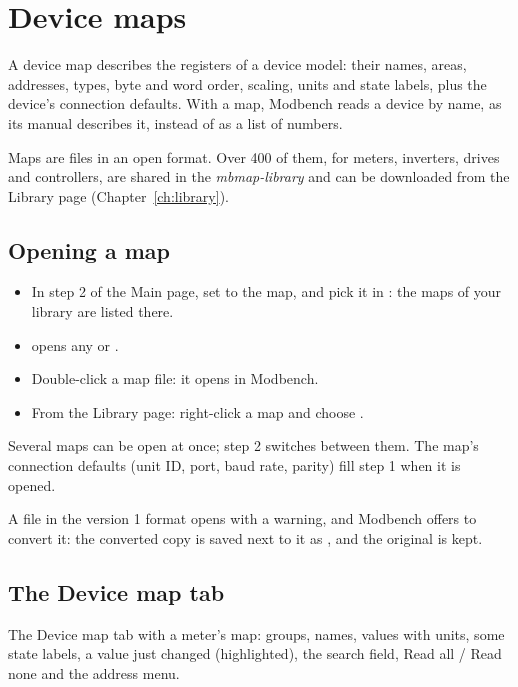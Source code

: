 \chapter{Device maps}
\label{ch:maps}

A device map describes the registers of a device model: their names, areas,
addresses, types, byte and word order, scaling, units and state labels, plus
the device's connection defaults. With a map, Modbench reads a device by
name, as its manual describes it, instead of as a list of numbers.

Maps are  files in an open format. Over 400 of them, for
meters, inverters, drives and controllers, are shared in the
\emph{mbmap-library} and can be downloaded from the Library page
(Chapter~\ref{ch:library}).

\section{Opening a map}

\begin{itemize}
  \item In step 2 of the Main page, set  to the map, and pick it
        in : the maps of your library are listed there.
  \item {} opens any  or .
  \item Double-click a map file: it opens in Modbench.
  \item From the Library page: right-click a map and choose .
\end{itemize}

Several maps can be open at once; step 2 switches between them.
The map's connection defaults (unit ID, port, baud rate, parity) fill step 1
when it is opened.

\begin{note}
A  file in the version 1 format opens with a warning, and
Modbench offers to convert it: the converted copy is saved next to it as
, and the original is kept.
\end{note}

\section{The Device map tab}

  {The Device map tab with a meter's map: groups, names, values with units,
   some state labels, a value just changed (highlighted), the search field,
   Read all / Read none and the address menu.}

